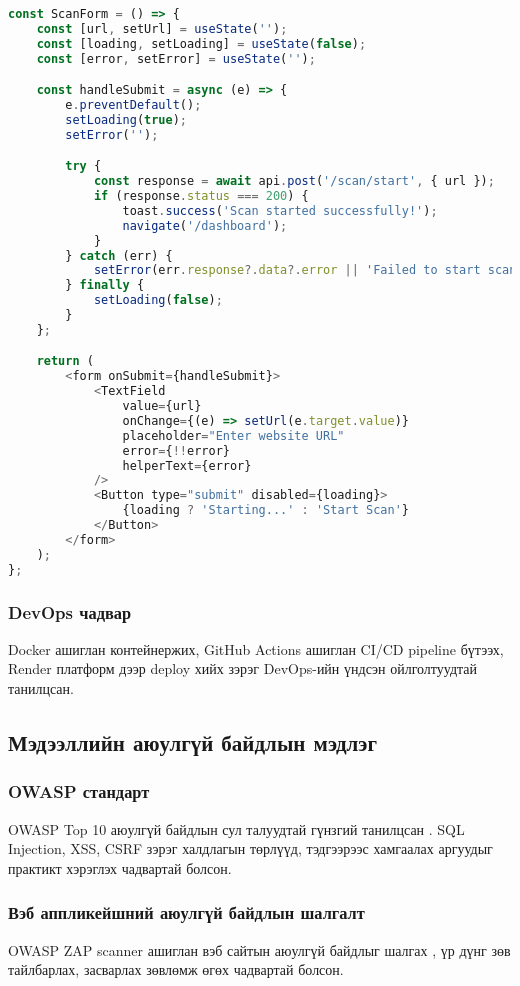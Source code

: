 \documentclass[main.tex]{subfiles}
\begin{document}
\begin{lstlisting}[language=JavaScript, caption=React компонент жишээ]
const ScanForm = () => {
    const [url, setUrl] = useState('');
    const [loading, setLoading] = useState(false);
    const [error, setError] = useState('');

    const handleSubmit = async (e) => {
        e.preventDefault();
        setLoading(true);
        setError('');

        try {
            const response = await api.post('/scan/start', { url });
            if (response.status === 200) {
                toast.success('Scan started successfully!');
                navigate('/dashboard');
            }
        } catch (err) {
            setError(err.response?.data?.error || 'Failed to start scan');
        } finally {
            setLoading(false);
        }
    };

    return (
        <form onSubmit={handleSubmit}>
            <TextField
                value={url}
                onChange={(e) => setUrl(e.target.value)}
                placeholder="Enter website URL"
                error={!!error}
                helperText={error}
            />
            <Button type="submit" disabled={loading}>
                {loading ? 'Starting...' : 'Start Scan'}
            </Button>
        </form>
    );
};
\end{lstlisting}

\subsubsection{DevOps чадвар}
Docker ашиглан контейнержих, GitHub Actions ашиглан CI/CD pipeline бүтээх, Render платформ дээр deploy хийх зэрэг DevOps-ийн үндсэн ойлголтуудтай танилцсан.

\subsection{Мэдээллийн аюулгүй байдлын мэдлэг}

\subsubsection{OWASP стандарт}
OWASP Top 10 аюулгүй байдлын сул талуудтай гүнзгий танилцсан \cite{3}. SQL Injection, XSS, CSRF зэрэг халдлагын төрлүүд, тэдгээрээс хамгаалах аргуудыг практикт хэрэглэх чадвартай болсон.

\subsubsection{Вэб аппликейшний аюулгүй байдлын шалгалт}
OWASP ZAP scanner ашиглан вэб сайтын аюулгүй байдлыг шалгах \cite{11}, үр дүнг зөв тайлбарлах, засварлах зөвлөмж өгөх чадвартай болсон.
\end{document}
